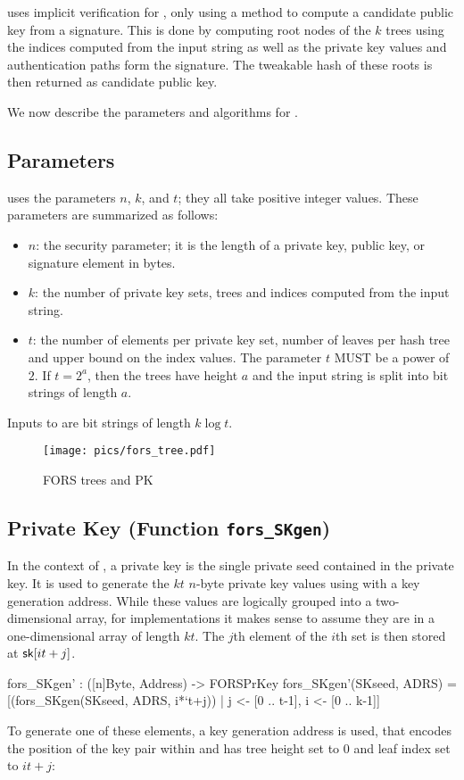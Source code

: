 \spx uses implicit verification for \fors, only using a method to compute
a candidate public key from a signature. This is done by computing root nodes
of the $k$ trees using the indices computed from the input string as well as
the private key values and authentication paths form the signature. The
tweakable hash of these roots is then returned as candidate public key.

%
We now describe the parameters and algorithms for \fors.

\subsection{\fors Parameters}\label{sec:fors:params}
\fors uses the parameters $n$, $k$, and $t$; they all take positive integer
values.
These parameters are summarized as follows:
\begin{itemize}
  \item $n$: the security parameter; it is the length of a private key, public
  key, or signature element in bytes.
  \item $k$: the number of private key sets, trees and indices computed
  from the input string.
  \item $t$: the number of elements per private key set, number of leaves per
  hash tree and upper bound on the index values. The parameter $t$ MUST
  be a power of $2$. If $t = 2^a$, then the trees have height $a$ and the
  input string is split into bit strings of length $a$.
\end{itemize}
Inputs to \fors are bit strings of length $k\log t$.

\begin{figure}[htb]
\texttt{[image: pics/fors\_tree.pdf]}
\caption{FORS trees and PK}
\end{figure}

\subsection{\fors Private Key (Function \texttt{fors\_SKgen})}
In the context of \spx, a \fors private key is the single private seed \sseed
contained in the \spx private key. It is used to generate the $kt$ $n$-byte
private key values using \sphincsPRF with a \fors key generation address. While these values are
logically grouped into a two-dimensional array, for implementations it makes sense to assume they
are in a one-dimensional array of length $kt$.
The $j$th element of the $i$th set is then stored at $\mathsf{sk}[it + j]$.
\begin{code}
  fors_SKgen' : ([n]Byte, Address) -> FORSPrKey
  fors_SKgen'(SKseed, ADRS) =
    [(fors_SKgen(SKseed, ADRS, i*`t+j)) | j <- [0 .. t-1], i <- [0 .. k-1]]
\end{code}
To generate one of these elements, a \fors key generation address \skadrs is used, that encodes the
position of the \fors key pair within \spx and has
tree height set to $0$ and leaf index set to $it+j$:

